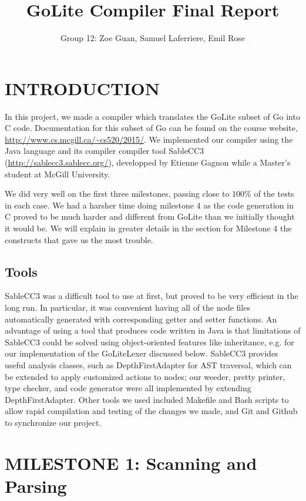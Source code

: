 \documentclass[11pt]{article}
\title{GoLite Compiler Final Report}
\author{Group 12: Zoe Guan, Samuel Laferriere, Emil Rose}
\begin{document}
\maketitle
\tableofcontents


\section{INTRODUCTION}

In this project, we made a compiler which translates the GoLite subset of Go into C code. Documentation for this subset of Go can be found on the course website, \url{http://www.cs.mcgill.ca/~cs520/2015/}. We implemented our compiler using the Java language and its compiler compiler tool SableCC3 (\url{http://sablecc3.sablecc.org/}), developped by Etienne Gagnon while a Master's student at McGill University. 

We did very well on the first three milestones, passing close to $100 \%$ of the tests in each case. We had a harsher time doing milestone 4 as the code generation in C proved to be much harder and different from GoLite than we initially thought it would be. We will explain in greater details in the section for Milestone 4 the constructs that gave us the most trouble.

\subsection{Tools}
SableCC3 was a difficult tool to use at first, but proved to be very efficient in the long run. In particular, it was convenient having all of the node files automatically generated with corresponding getter and setter functions. An advantage of using a tool that produces code written in Java is that limitations of SableCC3 could be solved using object-oriented features like inheritance, e.g. for our implementation of the GoLiteLexer discussed below. SableCC3 provides useful analysis classes, such as DepthFirstAdapter for AST traversal, which can be extended to apply customized actions to nodes; our weeder, pretty printer, type checker, and code generator were all implemented by extending DepthFirstAdapter. Other tools we used included Makefile and Bash scripts to allow rapid compilation and testing of the changes we made, and Git and Github to synchronize our project.


\section{MILESTONE 1: Scanning and Parsing}
\end{document}
